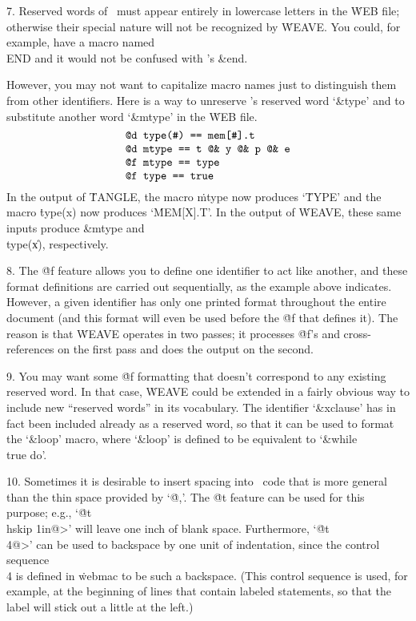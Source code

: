 7. Reserved words of \PASCAL\ must appear entirely in lowercase letters
in the \.{WEB} file; otherwise their special nature will not be recognized
by \.{WEAVE}. You could, for example, have a macro named \\{END} and it
would not be confused with \PASCAL's \&{end}.

However, you may not want to capitalize macro names just to distinguish them
from other identifiers.  Here is a way to unreserve \PASCAL's reserved word
`\&{type}' and to substitute another word `\&{mtype}' in the \.{WEB} file.
$$\vbox{\halign{\tt #\hfil\cr
@d type(\char'43) == mem[\char'43].t\cr
@d mtype == t \char'100\char'46{} y \char'100\char'46{} p
  \char'100\char'46{} e\cr
@f mtype == type\cr
@f type == true\cr}}$$
In the output of \.{TANGLE}, the macro \.{mtype} now produces `\.{TYPE}'
and the macro \.{type(x)} now produces `\.{MEM[X].T}'. In the output of
\.{WEAVE}, these same inputs produce \&{mtype} and \\{type}(\|x),
respectively.

8. The \.{@f} feature allows you to define one identifier to act like
another, and these format definitions are carried out sequentially, as the
example above indicates. However, a given identifier has only one printed format
throughout the entire document (and this format will even be used before
the \.{@f} that defines it). The reason is that \.{WEAVE} operates in two
passes; it processes \.{@f}'s and cross-references on the first pass and
does the output on the second.

9. You may want some \.{@f} formatting that doesn't correspond to any
existing reserved word. In that case, \.{WEAVE} could be extended in a
fairly obvious way to include new ``reserved words'' in its vocabulary.
The identifier `\&{xclause}' has in fact been included already as a
reserved word, so that it can be used to format the `\&{loop}' macro,
where `\&{loop}' is defined to be equivalent to `\&{while \\{true} do}'.

10. Sometimes it is desirable to insert spacing into \PASCAL\ code that is
more general than the thin space provided by `\.{@,}'. The \.{@t} feature
can be used for this purpose; e.g., `\.{@t\\hskip 1in@>}' will
leave one inch of blank space. Furthermore, `\.{@t\\4@>}' can be
used to backspace by one unit of indentation, since the control sequence
\.{\\4} is defined in \.{webmac} to be such a backspace. (This
control sequence is used, for example, at the beginning of lines that
contain labeled statements, so that the label will stick out a little at
the left.)

